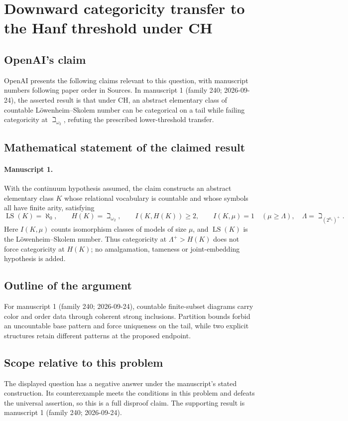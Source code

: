 \documentclass[11pt]{article}
\begin{document}
\section*{Downward categoricity transfer to the Hanf threshold under CH}

\subsection{OpenAI's claim}
OpenAI presents the following claims relevant to this question, with manuscript numbers following paper order in Sources. In manuscript 1 (family 240; 2026-09-24), the asserted result is that under CH, an abstract elementary class of countable L\"owenheim--Skolem number can be categorical on a tail while failing categoricity at $\beth_{\omega_2}$, refuting the prescribed lower-threshold transfer.

\subsection{Mathematical statement of the claimed result}
\paragraph{Manuscript 1.}
With the continuum hypothesis assumed, the claim constructs an abstract elementary class $K$ whose relational vocabulary is countable and whose symbols all have finite arity, satisfying
\[
 \operatorname{LS}(K)=\aleph_0,\qquad H(K)=\beth_{\omega_2},\qquad
 I(K,H(K))\ge2,\qquad I(K,\mu)=1\quad(\mu\ge\Lambda),
 \quad\Lambda=\beth_{(2^{\aleph_1})^+}.
\]
Here $I(K,\mu)$ counts isomorphism classes of models of size $\mu$, and $\operatorname{LS}(K)$ is the L\"owenheim--Skolem number. Thus categoricity at $\Lambda^+>H(K)$ does not force categoricity at $H(K)$; no amalgamation, tameness or joint-embedding hypothesis is added.

\subsection{Outline of the argument}
For manuscript 1 (family 240; 2026-09-24), countable finite-subset diagrams carry color and order data through coherent strong inclusions. Partition bounds forbid an uncountable base pattern and force uniqueness on the tail, while two explicit structures retain different patterns at the proposed endpoint.

\subsection{Scope relative to this problem}
The displayed question has a negative answer under the manuscript's stated construction. Its counterexample meets the conditions in this problem and defeats the universal assertion, so this is a full disproof claim. The supporting result is manuscript 1 (family 240; 2026-09-24).
\end{document}
